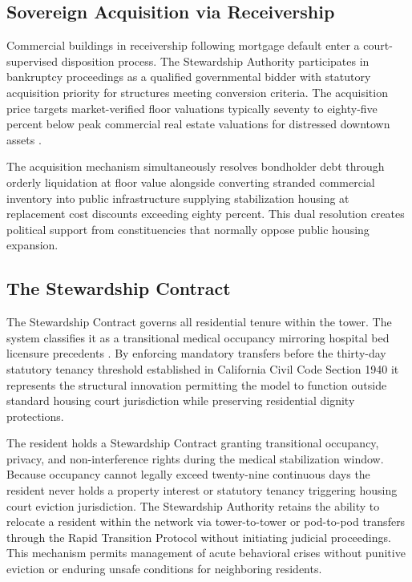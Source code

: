 \documentclass[12pt, letterpaper]{article}
\begin{document}
\subsection{Sovereign Acquisition via Receivership}

Commercial buildings in receivership following mortgage default enter a court-supervised disposition process. The Stewardship Authority participates in bankruptcy proceedings as a qualified governmental bidder with statutory acquisition priority for structures meeting conversion criteria. The acquisition price targets market-verified floor valuations typically seventy to eighty-five percent below peak commercial real estate valuations for distressed downtown assets \citep{globest_2025}.

The acquisition mechanism simultaneously resolves bondholder debt through orderly liquidation at floor value alongside converting stranded commercial inventory into public infrastructure supplying stabilization housing at replacement cost discounts exceeding eighty percent. This dual resolution creates political support from constituencies that normally oppose public housing expansion.

\subsection{The Stewardship Contract}

The Stewardship Contract governs all residential tenure within the tower. The system classifies it as a transitional medical occupancy mirroring hospital bed licensure precedents \citep{sro_hotel_licensure_2024}. By enforcing mandatory transfers before the thirty-day statutory tenancy threshold established in California Civil Code Section 1940 it represents the structural innovation permitting the model to function outside standard housing court jurisdiction while preserving residential dignity protections.

The resident holds a Stewardship Contract granting transitional occupancy, privacy, and non-interference rights during the medical stabilization window. Because occupancy cannot legally exceed twenty-nine continuous days the resident never holds a property interest or statutory tenancy triggering housing court eviction jurisdiction. The Stewardship Authority retains the ability to relocate a resident within the network via tower-to-tower or pod-to-pod transfers through the Rapid Transition Protocol without initiating judicial proceedings. This mechanism permits management of acute behavioral crises without punitive eviction or enduring unsafe conditions for neighboring residents.
\end{document}
